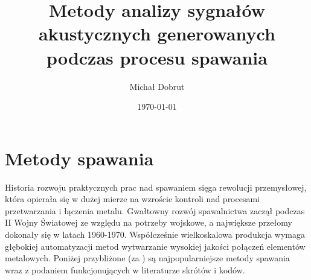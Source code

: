 \documentclass{mwart}
\title{Metody analizy sygnałów akustycznych generowanych podczas procesu spawania}
\author{Michał Dobrut}
\date{\today}
\begin{document}
\maketitle

\section{Metody spawania} 
Historia rozwoju praktycznych prac nad spawaniem sięga rewolucji przemysłowej, która opierała się w dużej mierze na wzroście kontroli nad procesami przetwarzania i łączenia metalu. Gwałtowny rozwój spawalnictwa zaczął podczas II Wojny Światowej ze względu na potrzeby wojskowe, a największe przełomy dokonały się w latach 1960-1970. Współcześnie wielkoskalowa produkcja wymaga głębokiej automatyzacji metod wytwarzanie wysokiej jakości połączeń elementów metalowych. Poniżej przybliżone (za \cite{naidu_modeling_2003}) są najpopularniejsze metody spawania wraz z podaniem funkcjonujących w literaturze skrótów i kodów.
\end{document}
